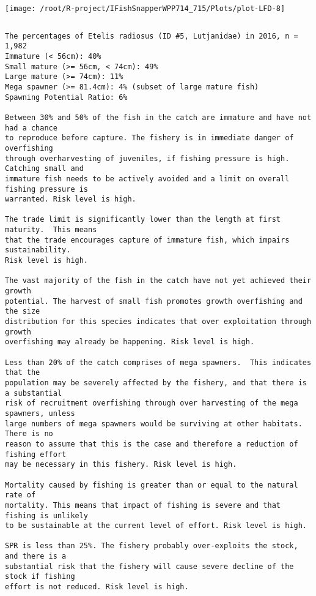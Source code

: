 \documentclass{report}\usepackage[]{graphicx}\usepackage[]{color}
\makeatletter
\def\maxwidth{ %
  \ifdim\Gin@nat@width>\linewidth
    \linewidth
  \else
    \Gin@nat@width
  \fi
}
\newenvironment{kframe}{%
 \def\at@end@of@kframe{}%
 \ifinner\ifhmode%
  \def\at@end@of@kframe{\end{minipage}}%
  \begin{minipage}{\columnwidth}%
 \fi\fi%
 \def\FrameCommand##1{\hskip\@totalleftmargin \hskip-\fboxsep
 \colorbox{shadecolor}{##1}\hskip-\fboxsep
     \hskip-\linewidth \hskip-\@totalleftmargin \hskip\columnwidth}%
 \MakeFramed {\advance\hsize-\width
   \@totalleftmargin\z@ \linewidth\hsize
   \@setminipage}}%
 {\par\unskip\endMakeFramed%
 \at@end@of@kframe}
\newenvironment{knitrout}{}{} %
\makeatother
\begin{document}
\begin{knitrout}
\texttt{[image: /root/R-project/IFishSnapperWPP714\_715/Plots/plot-LFD-8]} 
\begin{kframe}\begin{verbatim}
\end{verbatim}
\end{kframe}
\clearpage
\newpage
\begin{kframe}\begin{verbatim}The percentages of Etelis radiosus (ID #5, Lutjanidae) in 2016, n = 1,982
Immature (< 56cm): 40%
Small mature (>= 56cm, < 74cm): 49%
Large mature (>= 74cm): 11%
Mega spawner (>= 81.4cm): 4% (subset of large mature fish)
Spawning Potential Ratio: 6%
 
Between 30% and 50% of the fish in the catch are immature and have not had a chance
to reproduce before capture. The fishery is in immediate danger of overfishing
through overharvesting of juveniles, if fishing pressure is high.  Catching small and
immature fish needs to be actively avoided and a limit on overall fishing pressure is
warranted. Risk level is high.

The trade limit is significantly lower than the length at first maturity.  This means
that the trade encourages capture of immature fish, which impairs sustainability.
Risk level is high.

The vast majority of the fish in the catch have not yet achieved their growth
potential. The harvest of small fish promotes growth overfishing and the size
distribution for this species indicates that over exploitation through growth
overfishing may already be happening. Risk level is high.

Less than 20% of the catch comprises of mega spawners.  This indicates that the
population may be severely affected by the fishery, and that there is a substantial
risk of recruitment overfishing through over harvesting of the mega spawners, unless
large numbers of mega spawners would be surviving at other habitats. There is no
reason to assume that this is the case and therefore a reduction of fishing effort
may be necessary in this fishery. Risk level is high.
 
Mortality caused by fishing is greater than or equal to the natural rate of
mortality. This means that impact of fishing is severe and that fishing is unlikely
to be sustainable at the current level of effort. Risk level is high.
 
SPR is less than 25%. The fishery probably over-exploits the stock, and there is a
substantial risk that the fishery will cause severe decline of the stock if fishing
effort is not reduced. Risk level is high.
 

\end{verbatim}
\end{kframe}
\end{knitrout}
\end{document}
